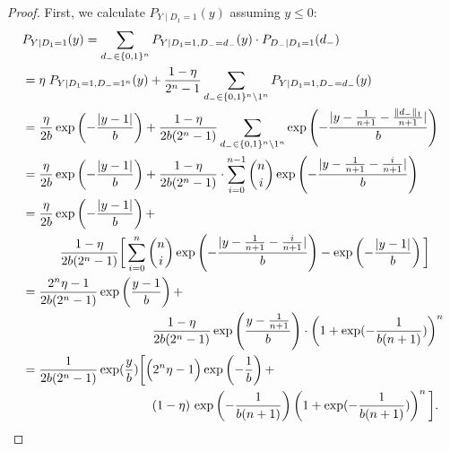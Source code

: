 \begin{proof}
First, we calculate $P_{Y \mid D_1=1}(y)$ assuming $y \leq 0$:
\begin{align*}
    &P_{Y \mid D_1=1}(y) = \sum_{d_- \in \{0,1\}^{n}} P_{Y \mid D_1=1, D_-=d_-}(y) \cdot P_{D_- \mid D_1=1}(d_-)\\
    &= \eta \; P_{Y \mid D_1=1, D_-= 1^n}(y) + \frac{1-\eta}{2^{n} -1} \sum_{d_- \in \{0,1\}^{n} \setminus 1^{n}} P_{Y \mid D_1=1, D_-=d_-}(y)\\
    &= \frac{\eta}{2b} \exp \left(- \frac{\abs{y - 1}}{b} \right) + \frac{1-\eta}{2b (2^{n} -1)} \sum_{d_- \in \{0,1\}^{n} \setminus 1^{n}} \exp \left(- \frac{\abs{y - \frac{1}{n+1} - \frac{\norm{d_-}_1}{n+1}}}{b} \right)\\
    &= \frac{\eta}{2b} \exp \left(- \frac{\abs{y - 1}}{b} \right) + \frac{1-\eta}{2b (2^{n} -1)} \cdot \sum_{i=0}^{n-1} \binom{n}{i} \exp \left(- \frac{\abs{y - \frac{1}{n+1} - \frac{i}{n+1}}}{b} \right)\\
    &= \frac{\eta}{2b} \exp \left(- \frac{\abs{y - 1}}{b} \right) + \\
    &\hspace{3em} \frac{1-\eta}{2b (2^{n} -1)} \bigg[ \sum_{i=0}^{n} \binom{n}{i} \exp \left(- \frac{\abs{y - \frac{1}{n+1} - \frac{i}{n+1}}}{b} \right) - \exp \left(- \frac{\abs{y -1}}{b} \right) \bigg]\\
    &= \frac{2^n \eta - 1}{2b (2^n - 1)} \exp \left(\frac{y - 1}{b} \right) + \\
    &\hspace{.3\textwidth} \frac{1-\eta}{2b (2^{n} -1)} \exp \left(\frac{y - \frac{1}{n+1}}{b}\right) \cdot \left(1 + \exp (- \frac{1}{b(n+1)}) \right)^n\\
    &= \frac{1}{2b (2^{n} -1)}\exp(\frac{y}{b}) \bigg[\Big(2^n \eta - 1\Big) \exp \left(-\frac{1}{b} \right) + \\
    &\hspace{.3\textwidth} (1-\eta) \, \exp \left(-\frac{1}{b(n+1)}\right) \left(1 + \exp (- \frac{1}{b(n+1)}) \right)^n \bigg].
\end{align*}


\end{proof}
